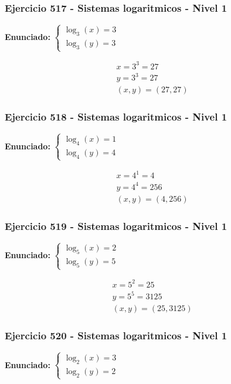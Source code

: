 \documentclass[12pt,a4paper]{article}
\begin{document}
\subsubsection*{Ejercicio 517 - Sistemas logaritmicos - Nivel 1}
\textbf{Enunciado:} \(\begin{cases} \log_{3}\left(x\right)=3\\ \log_{3}\left(y\right)=3\end{cases}\)

\[
\begin{aligned}
x=3^{3}=27\\
y=3^{3}=27\\
\boxed{(x,y)=(27,27)}
\end{aligned}
\]


\subsubsection*{Ejercicio 518 - Sistemas logaritmicos - Nivel 1}
\textbf{Enunciado:} \(\begin{cases} \log_{4}\left(x\right)=1\\ \log_{4}\left(y\right)=4\end{cases}\)

\[
\begin{aligned}
x=4^{1}=4\\
y=4^{4}=256\\
\boxed{(x,y)=(4,256)}
\end{aligned}
\]


\subsubsection*{Ejercicio 519 - Sistemas logaritmicos - Nivel 1}
\textbf{Enunciado:} \(\begin{cases} \log_{5}\left(x\right)=2\\ \log_{5}\left(y\right)=5\end{cases}\)

\[
\begin{aligned}
x=5^{2}=25\\
y=5^{5}=3125\\
\boxed{(x,y)=(25,3125)}
\end{aligned}
\]


\subsubsection*{Ejercicio 520 - Sistemas logaritmicos - Nivel 1}
\textbf{Enunciado:} \(\begin{cases} \log_{2}\left(x\right)=3\\ \log_{2}\left(y\right)=2\end{cases}\)
\end{document}
